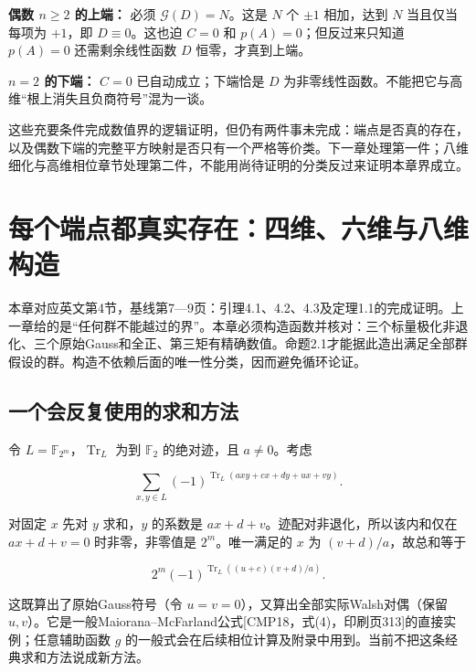\documentclass[UTF8,fontset=fandol,zihao=-4,openany,oneside]{ctexbook}
\begin{document}
\textbf{偶数 \(n\ge2\) 的上端：} 必须 \(\mathcal G(D)=N\)。这是 \(N\) 个 \(\pm1\) 相加，达到 \(N\) 当且仅当每项为 \(+1\)，即 \(D\equiv0\)。这也迫 \(C=0\) 和 \(p(A)=0\)；但反过来只知道 \(p(A)=0\) 还需剩余线性函数 \(D\) 恒零，才真到上端。



\textbf{\(n=2\) 的下端：} \(C=0\) 已自动成立；下端恰是 \(D\) 为非零线性函数。不能把它与高维“根上消失且负商符号”混为一谈。



这些充要条件完成数值界的逻辑证明，但仍有两件事未完成：端点是否真的存在，以及偶数下端的完整平方映射是否只有一个严格等价类。下一章处理第一件；八维细化与高维相位章节处理第二件，不能用尚待证明的分类反过来证明本章界成立。



\chapter{每个端点都真实存在：四维、六维与八维构造}


本章对应英文第4节，基线第7—9页：引理4.1、4.2、4.3及定理1.1的完成证明。上一章给的是“任何群不能越过的界”。本章必须构造函数并核对：三个标量极化非退化、三个原始Gauss和全正、第三矩有精确数值。命题2.1才能据此造出满足全部群假设的群。构造不依赖后面的唯一性分类，因而避免循环论证。



\section{一个会反复使用的求和方法}


令 \(L=\mathbb F_{2^m}\)，\(\operatorname{Tr}_L\) 为到 \(\mathbb F_2\) 的绝对迹，且 \(a\ne0\)。考虑



\[
\sum_{x,y\in L}(-1)^{\operatorname{Tr}_L(axy+cx+dy+ux+vy)}.
\]



对固定 \(x\) 先对 \(y\) 求和，\(y\) 的系数是 \(ax+d+v\)。迹配对非退化，所以该内和仅在 \(ax+d+v=0\) 时非零，非零值是 \(2^m\)。唯一满足的 \(x\) 为 \((v+d)/a\)，故总和等于



\[
2^m(-1)^{\operatorname{Tr}_L((u+c)(v+d)/a)}.
\tag{英文(4.2)，在本章所用的维数下}
\]



这既算出了原始Gauss符号（令 \(u=v=0\)），又算出全部实际Walsh对偶（保留 \(u,v\)）。它是一般Maiorana–McFarland公式[CMP18，式(4)，印刷页313]的直接实例；任意辅助函数 \(g\) 的一般式会在后续相位计算及附录中用到。当前不把这条经典求和方法说成新方法。
\end{document}
